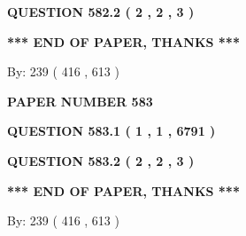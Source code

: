 \documentclass[12pt]{article}
\begin{document}
{\textbf{\Large{QUESTION
582.2 
 ( 2 , 2 , 3 )
}}}
  
  
   
   
 \vspace{0.2in}
 
   
   
   
   
\vspace{1.0in} 
{\textbf{\large{ *** END OF PAPER, THANKS *** }}} 
   
   
\hspace{1.0in} By: 
 239 ( 416 ,  613 )
   
   
   
   
\newpage 
\setcounter{page}{ 
   583001 } 
   
   
   
   
 {\textbf{ \Large{ PAPER NUMBER  583  }}}
   
   
\vspace{0.2in}
   
   
   
   
   
   
 \vspace{0.2in}
 
 
 
 
   
   
  
\vspace{0.2in}
  
{\textbf{\Large{QUESTION
583.1 
 ( 1 , 1 , 6791 )
}}}
  
  
  
\vspace{0.2in}
  
{\textbf{\Large{QUESTION
583.2 
 ( 2 , 2 , 3 )
}}}
  
  
   
   
 \vspace{0.2in}
 
   
   
   
   
\vspace{1.0in} 
{\textbf{\large{ *** END OF PAPER, THANKS *** }}} 
   
   
\hspace{1.0in} By: 
 239 ( 416 ,  613 )
   
   
   
   
\newpage 
\setcounter{page}{ 
   584001 } 
   
   
   
\end{document}

